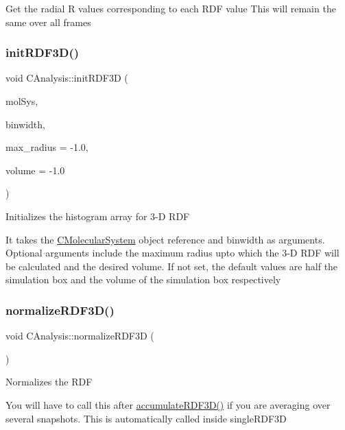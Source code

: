 Get the radial R values corresponding to each R\+DF value This will remain the same over all frames \mbox{\label{classCAnalysis_ac20cd821313a1e36ab0f63e93d6e4149}} 
\subsubsection{\texorpdfstring{init\+R\+D\+F3\+D()}{initRDF3D()}}
{\footnotesize\ttfamily void C\+Analysis\+::init\+R\+D\+F3D (\begin{DoxyParamCaption}\item[{class \mbox{\hyperlink{classCMolecularSystem}{C\+Molecular\+System}} \&}]{mol\+Sys,  }\item[{double}]{binwidth,  }\item[{double}]{max\+\_\+radius = {\ttfamily -\/1.0},  }\item[{double}]{volume = {\ttfamily -\/1.0} }\end{DoxyParamCaption})}

Initializes the histogram array for 3-\/D R\+DF

It takes the \mbox{\hyperlink{classCMolecularSystem}{C\+Molecular\+System}} object reference and binwidth as arguments. Optional arguments include the maximum radius upto which the 3-\/D R\+DF will be calculated and the desired volume. If not set, the default values are half the simulation box and the volume of the simulation box respectively \mbox{\label{classCAnalysis_a1716c9da84e9d41cbb32b97f7708e9f7}} 
\subsubsection{\texorpdfstring{normalize\+R\+D\+F3\+D()}{normalizeRDF3D()}}
{\footnotesize\ttfamily void C\+Analysis\+::normalize\+R\+D\+F3D (\begin{DoxyParamCaption}{ }\end{DoxyParamCaption})}

Normalizes the R\+DF

You will have to call this after \mbox{\hyperlink{classCAnalysis_a5d6f09a6fd0f9756e69ace8f595756b6}{accumulate\+R\+D\+F3\+D()}} if you are averaging over several snapshots. This is automatically called inside single\+R\+D\+F3D \mbox{\label{classCAnalysis_adf290a55dbb19e9150f03d45fb419cee}} 

